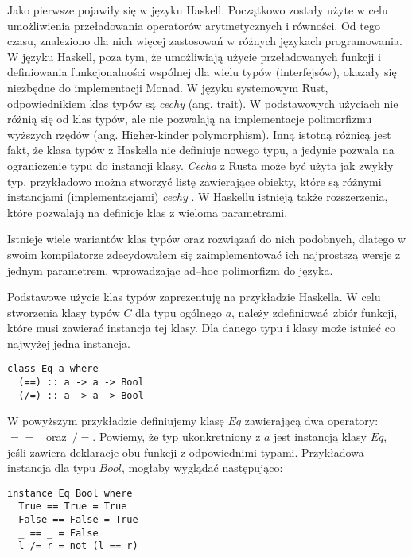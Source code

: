 \documentclass[declaration,shortabstract]{iithesis}
\begin{document}
Jako pierwsze pojawiły się w języku Haskell\cite{tc_wiki}. 
Początkowo zostały użyte w celu umożliwienia przeładowania operatorów 
arytmetycznych i równości. Od tego czasu, 
znaleziono dla nich więcej zastosowań w różnych językach programowania. W języku
Haskell, poza tym, że umożliwiają użycie przeładowanych funkcji i definiowania 
funkcjonalności wspólnej dla wielu typów (interfejsów), okazały się niezbędne 
do implementacji Monad. W języku systemowym Rust, odpowiednikiem klas typów są
\textit{cechy} (ang. trait). W podstawowych użyciach nie różnią się od klas typów, ale 
nie pozwalają na implementacje polimorfizmu wyższych rzędów 
\cite{no_hkt_in_rust} (ang. 
Higher-kinder polymorphism). Inną istotną różnicą jest fakt, że klasa typów z 
Haskella nie definiuje nowego typu, a jedynie pozwala na ograniczenie typu do 
instancji klasy. \textit{Cecha} z Rusta może być użyta jak zwykły typ, przykładowo 
można stworzyć listę zawierające obiekty, które są różnymi instancjami 
(implementacjami) \textit{cechy} \cite{traits_as_obj_rust}. W Haskellu istnieją także rozszerzenia, które 
pozwalają na definicje klas z wieloma parametrami. 


Istnieje wiele wariantów klas typów oraz rozwiązań do nich podobnych, dlatego w swoim 
kompilatorze zdecydowałem się zaimplementować ich najprostszą wersje z jednym 
parametrem, wprowadzając ad--hoc polimorfizm do języka.

Podstawowe użycie klas typów zaprezentuję na przykładzie Haskella. 
W celu stworzenia klasy typów $C$ dla typu ogólnego $a$, należy 
zdefiniować zbiór funkcji, które musi zawierać instancja tej klasy. Dla danego 
typu i klasy może istnieć co najwyżej jedna instancja. 

\begin{lstlisting}[frame=single, caption=Przykładowa definicja klasy typów.]
class Eq a where
  (==) :: a -> a -> Bool
  (/=) :: a -> a -> Bool
\end{lstlisting}

W powyższym przykładzie definiujemy klasę $Eq$ zawierającą dwa operatory:~$==$ 
~oraz~$/=$. Powiemy, że typ ukonkretniony z $a$ jest instancją klasy $Eq$, 
jeśli zawiera deklaracje obu funkcji z odpowiednimi typami. Przykładowa 
instancja dla typu $Bool$, mogłaby wyglądać następująco:

\begin{lstlisting}[frame=single, caption=Instancja klasy $Eq$ dla typu $Bool$.]
instance Eq Bool where
  True == True = True 
  False == False = True 
  _ == _ = False
  l /= r = not (l == r)
\end{lstlisting}
\end{document}
